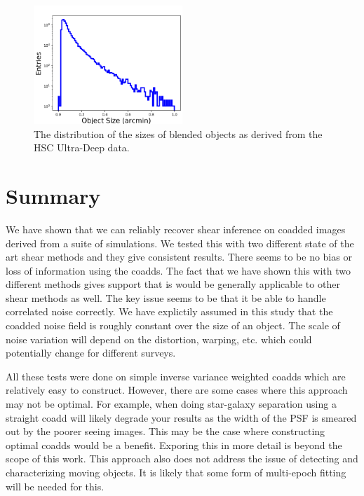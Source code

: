 \documentclass[fleqn,useAMS,usenatbib]{mnras}
\begin{document}
\begin{figure}
    \includegraphics[width=0.5\textwidth]{object_size.png}
    \caption{
    The distribution of the sizes of blended objects as derived from the HSC Ultra-Deep data.
    }
    \label{fig:size}
\end{figure}


\section{Summary}
\label{Section:Summary}

We have shown that we can reliably recover shear inference on coadded images derived from a suite of simulations.  We tested this with two different state of the art shear methods and they give consistent results.  There seems to be no bias or loss of information using the coadds.  The fact that we have shown this with two different methods gives support that is would be generally applicable to other shear methods as well.  The key issue seems to be that it be able to handle correlated noise correctly.  We have explictily assumed in this study that the coadded noise field is roughly constant over the size of an object.  The scale of noise variation will depend on the distortion, warping, etc. which could potentially change for different surveys.

All these tests were done on simple inverse variance weighted coadds which are relatively easy to construct.  However, there are some cases where this approach may not be optimal.  For example, when doing star-galaxy separation using a straight coadd will likely degrade your results as the width of the PSF is smeared out by the poorer seeing images.  This may be the case where constructing optimal coadds would be a benefit.  Exporing this in more detail is beyond the scope of this work.  This approach also does not address the issue of detecting and characterizing moving objects.  It is likely that some form of multi-epoch fitting will be needed for this.
\end{document}
